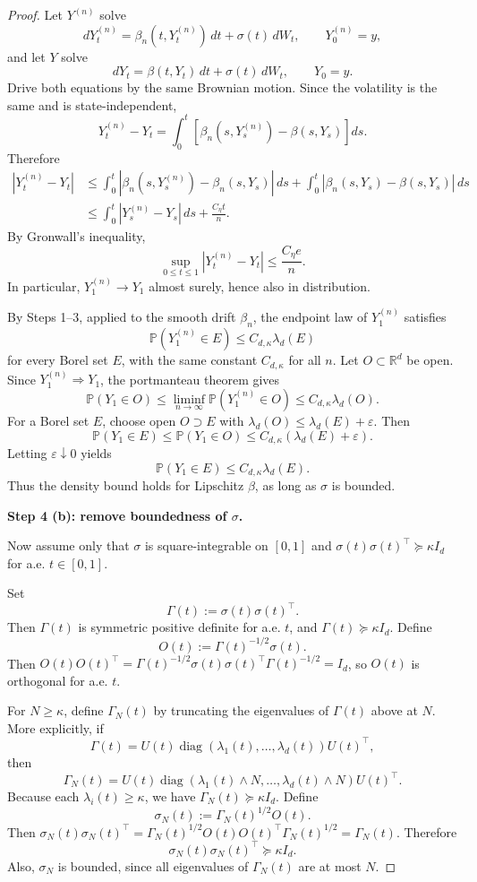 \documentclass{article}
\newcommand{\1}{\mathbbm{1}}
\numberwithin{equation}{section}
\def\to{\rightarrow}
\begin{document}
\begin{proof}
Let $Y^{(n)}$ solve
$$
dY_t^{(n)}
=
\beta_n(t,Y_t^{(n)})\,dt+\sigma(t)\,dW_t,
\qquad
Y_0^{(n)}=y,
$$
and let $Y$ solve
$$
dY_t
=
\beta(t,Y_t)\,dt+\sigma(t)\,dW_t,
\qquad
Y_0=y.
$$
Drive both equations by the same Brownian motion. Since the volatility is the
same and is state-independent,
$$
Y_t^{(n)}-Y_t
=
\int_0^t
\left[
\beta_n(s,Y_s^{(n)})-\beta(s,Y_s)
\right]ds.
$$
Therefore
$$
\begin{aligned}
|Y_t^{(n)}-Y_t|
&\le
\int_0^t
|\beta_n(s,Y_s^{(n)})-\beta_n(s,Y_s)|\,ds  
+
\int_0^t
|\beta_n(s,Y_s)-\beta(s,Y_s)|\,ds  \\
&\le
\int_0^t |Y_s^{(n)}-Y_s|\,ds
+
\frac{C_\eta t}{n}.
\end{aligned}
$$
By Gronwall's inequality,
$$
\sup_{0\le t\le1}|Y_t^{(n)}-Y_t|
\le
\frac{C_\eta e}{n}.
$$
In particular, $Y_1^{(n)}\to Y_1$ almost surely, hence also in distribution.

By Steps 1--3, applied to the smooth drift $\beta_n$, the endpoint law of
$Y_1^{(n)}$ satisfies
$$
\mathbb P(Y_1^{(n)}\in E)
\le
C_{d,\kappa}\lambda_d(E)
$$
for every Borel set $E$, with the same constant $C_{d,\kappa}$ for all $n$.
Let $O\subset\mathbb R^d$ be open. Since $Y_1^{(n)}\Rightarrow Y_1$, the
portmanteau theorem gives
$$
\mathbb P(Y_1\in O)
\le
\liminf_{n\to\infty}\mathbb P(Y_1^{(n)}\in O)
\le
C_{d,\kappa}\lambda_d(O).
$$
For a Borel set $E$, choose open $O\supset E$ with
$\lambda_d(O)\le\lambda_d(E)+\varepsilon$. Then
$$
\mathbb P(Y_1\in E)
\le
\mathbb P(Y_1\in O)
\le
C_{d,\kappa}(\lambda_d(E)+\varepsilon).
$$
Letting $\varepsilon\downarrow0$ yields
$$
\mathbb P(Y_1\in E)
\le
C_{d,\kappa}\lambda_d(E).
$$
Thus the density bound holds for Lipschitz $\beta$, as long as $\sigma$ is
bounded.

\medskip

\textbf{Step 4 (b): remove boundedness of $\sigma$.}

Now assume only that $\sigma$ is square-integrable on $[0,1]$ and $\sigma(t)\sigma(t)^\top\succeq \kappa I_d$ for a.e. $t\in[0,1]$.

Set
$$
\Gamma(t):=\sigma(t)\sigma(t)^\top.
$$
Then $\Gamma(t)$ is symmetric positive definite for a.e. $t$, and
$\Gamma(t)\succeq \kappa I_d$. Define
$$
O(t):=\Gamma(t)^{-1/2}\sigma(t).
$$
Then $O(t)O(t)^\top
=
\Gamma(t)^{-1/2}\sigma(t)\sigma(t)^\top \Gamma(t)^{-1/2}
=
I_d$, so $O(t)$ is orthogonal for a.e. $t$.

For $N\ge\kappa$, define $\Gamma_N(t)$ by truncating the eigenvalues of $\Gamma(t)$
above at $N$. More explicitly, if
$$
\Gamma(t)=U(t)\operatorname{diag}(\lambda_1(t),\ldots,\lambda_d(t))U(t)^\top,
$$
then
$$
\Gamma_N(t)
=
U(t)\operatorname{diag}(\lambda_1(t)\wedge N,\ldots,\lambda_d(t)\wedge N)
U(t)^\top.
$$
Because each $\lambda_i(t)\ge\kappa$, we have $\Gamma_N(t)\succeq \kappa I_d$. Define
$$
\sigma_N(t):=\Gamma_N(t)^{1/2}O(t).
$$
Then $\sigma_N(t)\sigma_N(t)^\top
=
\Gamma_N(t)^{1/2}O(t)O(t)^\top \Gamma_N(t)^{1/2}
=
\Gamma_N(t)$. Therefore
$$
\sigma_N(t)\sigma_N(t)^\top\succeq \kappa I_d.
$$
Also, $\sigma_N$ is bounded, since all eigenvalues of $\Gamma_N(t)$ are at most
$N$.


\end{proof}
\end{document}
